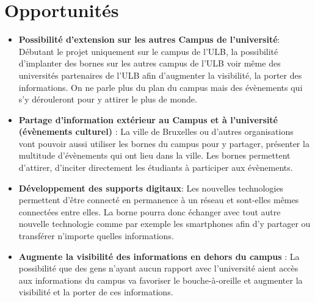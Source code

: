 \section{Opportunités}
\begin{itemize}
    \item \textbf{Possibilité d’extension sur les autres Campus de l’université}: Débutant le projet uniquement sur le campus de l’ULB, la possibilité d’implanter des bornes sur les autres campus de l’ULB voir même des universités partenaires de l’ULB afin d’augmenter la visibilité, la porter des informations. On ne parle plus du plan du campus mais des évènements qui s’y dérouleront pour y attirer le plus de monde. 
    \item \textbf{Partage d’information extérieur au Campus et à l’université (évènements culturel)} : La ville de Bruxelles ou d’autres organisations vont pouvoir aussi utiliser les bornes du campus pour y partager, présenter la multitude d’évènements qui ont lieu dans la ville. Les bornes permettent d’attirer, d’inciter directement les étudiants à participer aux évènements. 
    \item \textbf{Développement des supports digitaux}: Les nouvelles technologies permettent d’être connecté en permanence à un réseau et sont-elles mêmes connectées entre elles. La borne pourra donc échanger avec tout autre nouvelle technologie comme par exemple les smartphones afin d’y partager ou transférer n’importe quelles informations. 
    \item \textbf{Augmente la visibilité des informations en dehors du campus} : La possibilité que des gens n’ayant aucun rapport avec l’université aient accès aux informations du campus va favoriser le bouche-à-oreille et augmenter la visibilité et la porter de ces informations.
\end{itemize}

